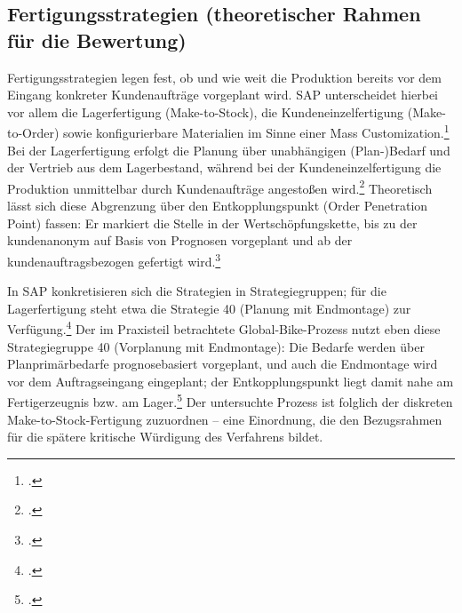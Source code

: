 \subsection{Fertigungsstrategien (theoretischer Rahmen für die Bewertung)}
Fertigungsstrategien legen fest, ob und wie weit die Produktion bereits vor dem Eingang konkreter Kundenaufträge vorgeplant wird. SAP unterscheidet hierbei vor allem die Lagerfertigung (Make-to-Stock), die Kundeneinzelfertigung (Make-to-Order) sowie konfigurierbare Materialien im Sinne einer Mass Customization.\footcite[Vgl.][Folie 32]{SAPUCC.2023} Bei der Lagerfertigung erfolgt die Planung über unabhängigen (Plan-)Bedarf und der Vertrieb aus dem Lagerbestand, während bei der Kundeneinzelfertigung die Produktion unmittelbar durch Kundenaufträge angestoßen wird.\footcite[Vgl.][Folie 33]{SAPUCC.2023} Theoretisch lässt sich diese Abgrenzung über den Entkopplungspunkt (Order Penetration Point) fassen: Er markiert die Stelle in der Wertschöpfungskette, bis zu der kundenanonym auf Basis von Prognosen vorgeplant und ab der kundenauftragsbezogen gefertigt wird.\footcite[Vgl.][S. 35 ff. u. 173 ff.]{Kurbel.2021}

In SAP konkretisieren sich die Strategien in Strategiegruppen; für die Lagerfertigung steht etwa die Strategie 40 (Planung mit Endmontage) zur Verfügung.\footcite[Vgl.][Folie 33]{SAPUCC.2023} Der im Praxisteil betrachtete Global-Bike-Prozess nutzt eben diese Strategiegruppe 40 (Vorplanung mit Endmontage): Die Bedarfe werden über Planprimärbedarfe prognosebasiert vorgeplant, und auch die Endmontage wird vor dem Auftragseingang eingeplant; der Entkopplungspunkt liegt damit nahe am Fertigerzeugnis bzw. am Lager.\footcites[Vgl.][Folie 33]{SAPUCC.2023}[][S. 6]{Boldau.2023} Der untersuchte Prozess ist folglich der diskreten Make-to-Stock-Fertigung zuzuordnen -- eine Einordnung, die den Bezugsrahmen für die spätere kritische Würdigung des Verfahrens bildet.
